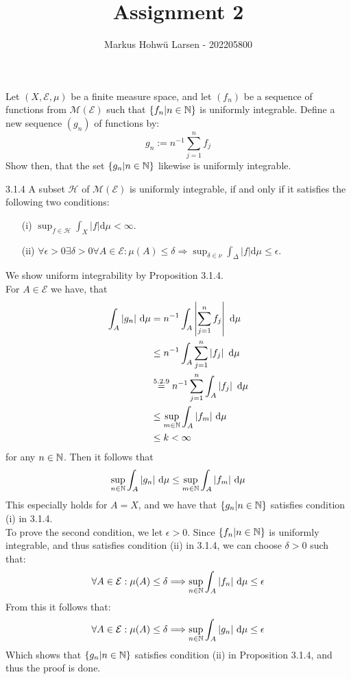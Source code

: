 \documentclass{Class}
\title{Assignment 2}
\author{Markus Hohwü Larsen - 202205800}
\begin{document}
Let $(X,\mathcal{E}, \mu)$ be a finite measure space, and let $(f_n)$ be a sequence of functions from $\mathcal{M}(\mathcal{E})$ such that $\{f_n|n\in\mathbb{N}\}$ is uniformly integrable. Define a new sequence $(g_n)$ of functions by:
$$g_n:=n^{-1}\sum_{j=1}^{n}f_j$$
Show then, that the set $\{g_n|n\in\mathbb{N}\}$ likewise is uniformly integrable.
\begin{prop-manual}{3.1.4}
    A subset $\mathcal{H}$ of $\mathcal{M}(\mathcal{E})$ is uniformly integrable, if and only if it satisfies the following two conditions:
    \begin{enumerate}
        \item[\textnormal{(i)}]$\sup _{f \in \mathcal{H}} \int_X|f| \mathrm{d} \mu<\infty$.
        \item[\textnormal{(ii)}] $\forall \epsilon>0 \exists \delta>0 \forall A \in \mathcal{E}: \mu(A) \leq \delta \Longrightarrow \sup _{\delta \in \nu} \int_{\Delta}|f| \mathrm{d} \mu \leq \epsilon$.
    \end{enumerate}
\end{prop-manual}
\solution
We show uniform integrability by Proposition 3.1.4.\\
For $A\in\mathcal{E}$ we have, that
$$\begin{aligned}
    \int_A|g_n|\mathrm{~d}\mu&=n^{-1}\int_A \left|\sum_{j=1}^{n}f_j\right|\mathrm{~d}\mu\\
    &\leq n^{-1}\int_A\sum_{j=1}^{n}\left|f_j\right|\mathrm{~d}\mu\\
    &\stackrel{5.2.9}{=} n^{-1}\sum_{j=1}^{n}\int_A\left|f_j\right|\mathrm{~d}\mu\\
    &\leq \sup_{m\in\mathbb{N}}\int_A|f_m|\mathrm{~d}\mu\\ &\leq k <\infty
\end{aligned}$$
for any $n\in\mathbb{N}$. Then it follows that
$$\sup_{n\in\mathbb{N}}\int_A |g_n|\mathrm{~d}\mu \leq \sup_{m\in\mathbb{N}}\int_A|f_m|\mathrm{~d}\mu$$
This especially holds for $A=X$, and we have that $\{g_n|n\in\mathbb{N}\}$ satisfies condition (i) in 3.1.4.
\\To prove the second condition, we let $\epsilon > 0$. Since $\{f_n|n\in\mathbb{N}\}$ is uniformly integrable, and thus satisfies condition (ii) in 3.1.4, we can choose $\delta > 0$ such that:
$$\forall A\in\mathcal{E}:\mu(A)\leq\delta\Longrightarrow\sup_{n\in\mathbb{N}}\int_A|f_n|\mathrm{~d}\mu\leq \epsilon$$
From this it follows that:
$$\forall A\in\mathcal{E}:\mu(A)\leq\delta\Longrightarrow\sup_{n\in\mathbb{N}}\int_A|g_n|\mathrm{~d}\mu\leq \epsilon$$
Which shows that $\{g_n|n\in\mathbb{N}\}$ satisfies condition (ii) in Proposition 3.1.4, and thus the proof is done.
\end{document}
